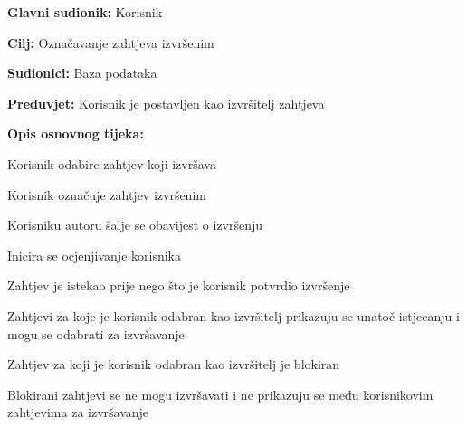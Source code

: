 		
			\noindent {}
			\begin{packed_item}
				
				\item \textbf{Glavni sudionik: }Korisnik
				\item  \textbf{Cilj:} Označavanje zahtjeva izvršenim 
				\item  \textbf{Sudionici:} Baza podataka
				\item  \textbf{Preduvjet:} Korisnik je postavljen kao izvršitelj zahtjeva
				\item  \textbf{Opis osnovnog tijeka:}
				
				\item[] \begin{packed_enum}
					
					\item Korisnik odabire zahtjev koji izvršava
					\item Korisnik označuje zahtjev izvršenim
					\item Korisniku autoru šalje se obavijest o izvršenju
					\item Inicira se ocjenjivanje korisnika

				\end{packed_enum}
			
				\item[1.a] Zahtjev je istekao prije nego što je korisnik potvrdio izvršenje
				\item[] \begin{packed_enum}
					
					\item Zahtjevi za koje je korisnik odabran kao izvršitelj prikazuju se unatoč istjecanju i mogu se odabrati za izvršavanje
					
				\end{packed_enum}
				\item[1.b] Zahtjev za koji je korisnik odabran kao izvršitelj je blokiran
				\item[] \begin{packed_enum}
					
					\item Blokirani zahtjevi se ne mogu izvršavati i ne prikazuju se među korisnikovim zahtjevima za izvršavanje
					
				\end{packed_enum}
					
				
			\end{packed_item}
		
